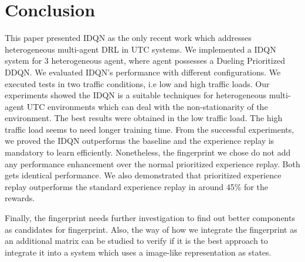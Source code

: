 \documentclass{llncs}
\begin{document}
\section{Conclusion}

This paper presented IDQN as the only recent work which addresses heterogeneous multi-agent DRL in UTC systems. We implemented a IDQN system for 3 heterogeneous agent, where agent possesses a Dueling Prioritized DDQN. We evaluated IDQN's performance with different configurations. We executed tests in two traffic conditions, i.e low and high traffic loads. Our experiments showed the IDQN is a suitable techniques for heterogeneous multi-agent UTC environments which can deal with the non-stationarity of the environment. The best results were obtained in the low traffic load. The high traffic load seems to need longer training time. From the successful experiments, we proved the IDQN outperforms the baseline and the experience replay is mandatory to learn efficiently. Nonetheless, the fingerprint we chose do not add any performance enhancement over the normal prioritized experience replay. Both gets identical performance. We also demonstrated that prioritized experience replay outperforms the standard experience replay in around 45$\%$ for the rewards.

Finally, the fingerprint needs further investigation to find out better components as candidates for fingerprint. Also, the way of how we integrate the fingerprint as an additional matrix can be studied to verify if it is the best approach to integrate it into a system which uses a image-like representation as states.


 
\end{document}
